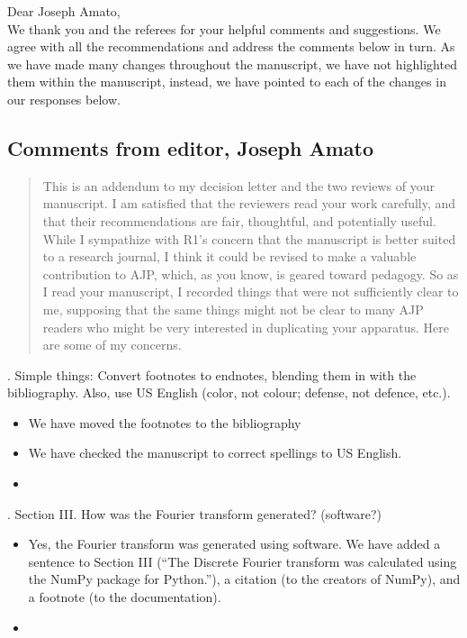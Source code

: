 \documentclass{article}
\begin{document}
\noindent Dear Joseph Amato, \\

\noindent We thank you and the referees for your helpful comments and suggestions. 
We agree with all the recommendations and address the comments below in turn. %
As we have made many changes throughout the manuscript, we have not highlighted them within the manuscript, instead, we have pointed to each of the changes in our responses below. 

\subsection*{Comments from editor, Joseph Amato}
\begin{quote}
This is an addendum to my decision letter and the two reviews of your manuscript.  I am satisfied that the reviewers read your work carefully, and that their recommendations are fair, thoughtful, and potentially useful.  While I sympathize with R1’s concern that the manuscript is better suited to a research journal, I think it could be revised to make a valuable contribution to AJP, which, as you know, is geared toward pedagogy.  So as I read your manuscript, I recorded things that were not sufficiently clear to me, supposing that the same things might not be clear to many AJP readers who might be very interested in duplicating your apparatus.  Here are some of my concerns.
\end{quote}

. Simple things: Convert footnotes to endnotes, blending them in with the bibliography.  Also, use US English (color, not colour; defense, not defence, etc.). 
\begin{itemize}
\item We have moved the footnotes to the bibliography
\item We have checked the manuscript to correct spellings to US English. 
\item[]
\end{itemize}

. Section III.  How was the Fourier transform generated?  (software?)
\begin{itemize}
\item Yes, the Fourier transform was generated using software. We have added a sentence to Section III (``The Discrete Fourier transform was calculated using the NumPy package for Python.''), a citation (to the creators of NumPy), and a footnote (to the documentation).
\item[]
\end{itemize}
\end{document}
